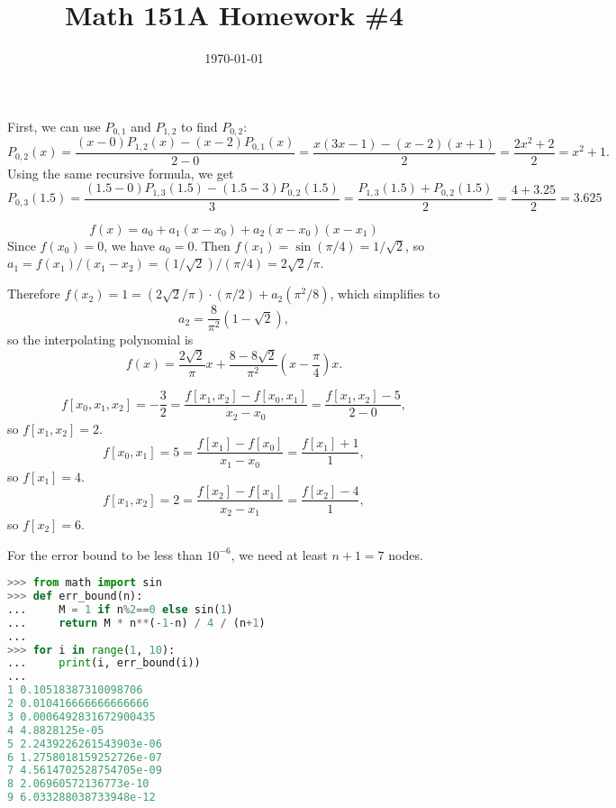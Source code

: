 \documentclass{article}
\date{\today}
\title{Math 151A Homework \#4}
\begin{document}
\maketitle

\bigskip
\begin{prob}
\end{prob}
First, we can use $P_{0,1}$ and $P_{1,2}$ to find $P_{0,2}$:
\[ P_{0,2}(x) = \frac{(x-0)P_{1,2}(x) - (x-2)P_{0,1}(x)}{2-0} = \frac{x(3x-1) - (x-2)(x+1)}{2} = \frac{2x^2 +2}{2} = x^2+1. \]
Using the same recursive formula, we get
\[ P_{0,3}(1.5) = \frac{(1.5-0)P_{1,3}(1.5) - (1.5-3)P_{0,2}(1.5)}{3} = \frac{P_{1,3}(1.5)+P_{0,2}(1.5)}{2} = \frac{4+3.25}{2} = 3.625 \]

\bigskip
\begin{prob}
\end{prob}
\[ f(x) = a_0 + a_1 (x - x_0) + a_2 (x - x_0) (x - x_1) \]
Since $f(x_0) = 0$, we have $a_0 = 0$. Then $f(x_1) = \sin(\pi/4) = 1/\sqrt{2}$, so $a_1 = f(x_1) / (x_1 - x_2) = (1/\sqrt{2}) / (\pi/4) = 2\sqrt{2}/\pi$.
\par
Therefore $f(x_2) = 1 = (2\sqrt{2}/\pi)\cdot(\pi/2) + a_2 (\pi^2/8)$, which simplifies to
\[ a_2 = \frac{8}{\pi^2} \left( 1 - \sqrt{2} \right), \]
so the interpolating polynomial is
\[ f(x) = \frac{2\sqrt{2}}{\pi} x + \frac{8-8\sqrt{2}}{\pi^2} \left( x- \frac{\pi}{4} \right) x. \]

\bigskip
\begin{prob}
\end{prob}
\[ f[x_0,x_1,x_2] = - \frac{3}{2} = \frac{f[x_1,x_2] - f[x_0, x_1]}{x_2-x_0} = \frac{f[x_1,x_2]-5}{2-0}, \]
so $f[x_1,x_2]=2$.
\[ f[x_0,x_1] = 5 = \frac{f[x_1]-f[x_0]}{x_1-x_0} = \frac{f[x_1]+1}{1}, \]
so $f[x_1]=4$.
\[ f[x_1,x_2] = 2 = \frac{f[x_2]-f[x_1]}{x_2-x_1} = \frac{f[x_2]-4}{1}, \]
so $f[x_2]=6$.

\bigskip
\begin{prob}
\end{prob}
For the error bound to be less than $10^{-6}$, we need at least $n+1=7$ nodes.
\begin{lstlisting}[language=Python]
>>> from math import sin
>>> def err_bound(n):
...     M = 1 if n%2==0 else sin(1)
...     return M * n**(-1-n) / 4 / (n+1)
... 
>>> for i in range(1, 10):
...     print(i, err_bound(i))
... 
1 0.10518387310098706
2 0.010416666666666666
3 0.0006492831672900435
4 4.8828125e-05
5 2.2439226261543903e-06
6 1.2758018159252726e-07
7 4.5614702528754705e-09
8 2.06960572136773e-10
9 6.033288038733948e-12
\end{lstlisting}
\end{document}
